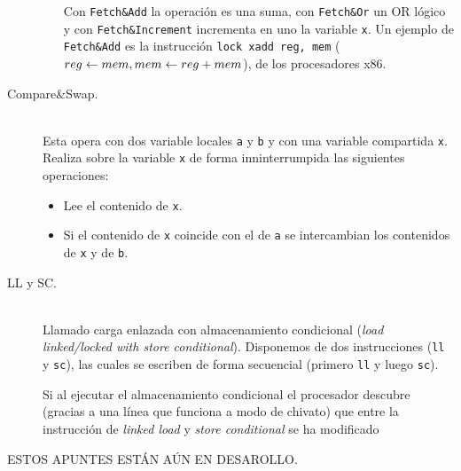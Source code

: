 \begin{description}
\begin{itemize}
                Con \verb|Fetch&Add| la operación es una suma, con \verb|Fetch&Or| un OR lógico y con \verb|Fetch&Increment| incrementa en uno la variable \verb|x|. Un ejemplo de \verb|Fetch&Add| es la instrucción \verb|lock xadd reg, mem| (${reg\leftarrow mem},\newline {mem\leftarrow reg + mem}$), de los procesadores x86.
        \end{itemize}
    \item [Compare\&Swap.]~\\
        Esta opera con dos variable locales \verb|a| y \verb|b| y con una variable compartida \verb|x|. Realiza sobre la variable \verb|x| de forma inninterrumpida las siguientes operaciones:
        \begin{itemize}
            \item Lee el contenido de \verb|x|.
            \item Si el contenido de \verb|x| coincide con el de \verb|a| se intercambian los contenidos de \verb|x| y de \verb|b|.
        \end{itemize}
    \item [LL y SC.]~\\
        Llamado carga enlazada con almacenamiento condicional (\emph{load linked/locked with store conditional}). Disponemos de dos instrucciones (\verb|ll| y \verb|sc|), las cuales se escriben de forma secuencial (primero \verb|ll| y luego \verb|sc|).

        Si al ejecutar el almacenamiento condicional el procesador descubre (gracias a una línea que funciona a modo de chivato) que entre la instrucción de \emph{linked load} y \emph{store conditional} se ha modificado %
\end{description}



ESTOS APUNTES ESTÁN AÚN EN DESAROLLO.

